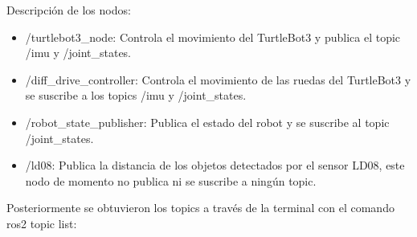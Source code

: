 \documentclass[a4paper,12pt]{article}
\begin{document}
{Descripción de los nodos:

\begin{itemize}
  \item /turtlebot3\_node: Controla el movimiento del TurtleBot3 y publica el topic /imu y /joint\_states.
  \item /diff\_drive\_controller: Controla el movimiento de las ruedas del TurtleBot3 y se suscribe a los topics /imu y /joint\_states.
  \item /robot\_state\_publisher: Publica el estado del robot y se suscribe al topic /joint\_states.
  \item /ld08: Publica la distancia de los objetos detectados por el sensor LD08, este nodo 
        de momento no publica ni se suscribe a ningún topic.
\end{itemize}

\vspace{0.5cm}

Posteriormente se obtuvieron los topics a través de la terminal con el comando ros2 topic list:

\vspace{0.5cm}

}
\end{document}
